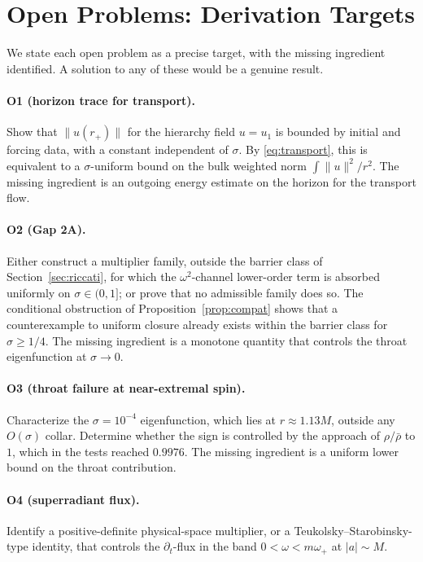 \documentclass[11pt, a4paper]{article}
\theoremstyle{remark}
\theoremstyle{definition}
\begin{document}
\section{Open Problems: Derivation Targets}
\label{sec:open}

We state each open problem as a precise target, with the missing ingredient identified. A solution to any of these would be a genuine result.

\paragraph{O1 (horizon trace for transport).} Show that $\|u(r_+)\|$ for the hierarchy field $u = u_1$ is bounded by initial and forcing data, with a constant independent of $\sigma$. By \eqref{eq:transport}, this is equivalent to a $\sigma$-uniform bound on the bulk weighted norm $\int\|u\|^2/r^2$. The missing ingredient is an outgoing energy estimate on the horizon for the transport flow.

\paragraph{O2 (Gap 2A).} Either construct a multiplier family, outside the barrier class of Section~\ref{sec:riccati}, for which the $\omega^2$-channel lower-order term is absorbed uniformly on $\sigma\in(0,1]$; or prove that no admissible family does so. The conditional obstruction of Proposition~\ref{prop:compat} shows that a counterexample to uniform closure already exists within the barrier class for $\sigma\ge1/4$. The missing ingredient is a monotone quantity that controls the throat eigenfunction at $\sigma\to0$.

\paragraph{O3 (throat failure at near-extremal spin).} Characterize the $\sigma=10^{-4}$ eigenfunction, which lies at $r\approx1.13M$, outside any $O(\sigma)$ collar. Determine whether the sign is controlled by the approach of $\rho/\bar\rho$ to $1$, which in the tests reached $0.9976$. The missing ingredient is a uniform lower bound on the throat contribution.

\paragraph{O4 (superradiant flux).} Identify a positive-definite physical-space multiplier, or a Teukolsky--Starobinsky-type identity, that controls the $\partial_t$-flux in the band $0<\omega<m\omega_+$ at $|a|\sim M$.
\end{document}
